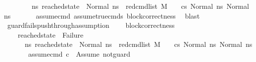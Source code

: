 \begin{isabellebody}
\ \ \ \ \ \ \ {\isacharparenleft}{\kern0pt}{\isasymforall}\ ns{}{\isacharprime}{\kern0pt}{\isachardot}{\kern0pt}\ reached{\isacharunderscore}{\kern0pt}state\ {\isacharequal}{\kern0pt}\ Normal\ ns{}{\isacharprime}{\kern0pt}\ {\isasymlongrightarrow}\ {\isacharparenleft}{\kern0pt}red{\isacharunderscore}{\kern0pt}cmd{\isacharunderscore}{\kern0pt}list\ M\ {\isasymLambda}\ {\isasymGamma}\ {\isasymOmega}\ {\isacharparenleft}{\kern0pt}cs{}{\isacharparenright}{\kern0pt}\ {\isacharparenleft}{\kern0pt}Normal\ ns{}{\isacharparenright}{\kern0pt}\ {\isacharparenleft}{\kern0pt}Normal\ ns{}{\isacharprime}{\kern0pt}{\isacharparenright}{\kern0pt}{\isacharparenright}{\kern0pt}{\isacharparenright}{\kern0pt}{\isachardoublequoteclose}\ \isanewline
%
\isadelimproof
\ \ \ \ %
\endisadelimproof
%
\isatagproof
{}\isamarkupfalse%
\ assume{\isacharunderscore}{\kern0pt}cmd\ assume{\isacharunderscore}{\kern0pt}true{\isacharunderscore}{\kern0pt}cmds\ block{\isacharunderscore}{\kern0pt}correctness\ \isamarkupfalse%
\ blast%
\endisatagproof
{\isafoldproof}%
%
\isadelimproof
\isanewline
%
\endisadelimproof
\isanewline
{}\isamarkupfalse%
\ guard{\isacharunderscore}{\kern0pt}fails{\isacharunderscore}{\kern0pt}push{\isacharunderscore}{\kern0pt}through{\isacharunderscore}{\kern0pt}assumption{\isacharcolon}{\kern0pt}\ \isanewline
\ \ \ block{\isacharunderscore}{\kern0pt}correctness{\isacharcolon}{\kern0pt}\ \isanewline
\ \ \ \ {\isachardoublequoteopen}reached{\isacharunderscore}{\kern0pt}state\ {\isasymnoteq}\ Failure\ {\isasymand}\ \isanewline
\ \ \ \ \ {\isacharparenleft}{\kern0pt}{\isasymforall}\ ns{}{\isacharprime}{\kern0pt}{\isachardot}{\kern0pt}\ reached{\isacharunderscore}{\kern0pt}state\ {\isacharequal}{\kern0pt}\ Normal\ ns{}{\isacharprime}{\kern0pt}\ {\isasymlongrightarrow}\ {\isacharparenleft}{\kern0pt}red{\isacharunderscore}{\kern0pt}cmd{\isacharunderscore}{\kern0pt}list\ M\ {\isasymLambda}\ {\isasymGamma}\ {\isasymOmega}\ {\isacharparenleft}{\kern0pt}cs{}{\isacharparenright}{\kern0pt}\ {\isacharparenleft}{\kern0pt}Normal\ ns{}{\isacharparenright}{\kern0pt}\ {\isacharparenleft}{\kern0pt}Normal\ ns{}{\isacharprime}{\kern0pt}{\isacharparenright}{\kern0pt}{\isacharparenright}{\kern0pt}{\isacharparenright}{\kern0pt}{\isachardoublequoteclose}\isanewline
\ \ \ \ \ \ \ assume{\isacharunderscore}{\kern0pt}cmd{\isacharcolon}{\kern0pt}\ {\isachardoublequoteopen}c\ {\isacharequal}{\kern0pt}\ Assume\ not{\isacharunderscore}{\kern0pt}guard{\isachardoublequoteclose}\isanewline

\end{isabellebody}
